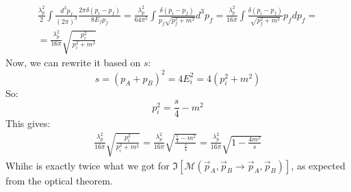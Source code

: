 \documentclass{article}
\begin{document}
\begin{equation}
\begin{gathered}
    \frac{\lambda_p^2}{2}\int \frac{d^3p_f}{(2\pi)^3} \frac{2\pi \delta(p_i - p_f)}{8E_fp_f} =
    \frac{\lambda_p^2}{64\pi^2}\int \frac{\delta(p_i - p_f)}{p_f\sqrt{p_f^2 + m^2}}d^3p_f = 
    \frac{\lambda_p^2}{16\pi}\int \frac{\delta(p_i - p_f)}{\sqrt{p_f^2 + m^2}}p_f dp_f = \\ =
    \frac{\lambda_p^2}{16\pi}\sqrt{\frac{p_i^2}{p_i^2 + m^2}}
\end{gathered}
\end{equation}
Now, we can rewrite it based on $s$:
\begin{equation}
    s = (p_A + p_B)^2 = 4E_i^2 = 4\left(p_i^2 + m^2\right)
\end{equation}
So:
\begin{equation}
    p_i^2 = \frac{s}{4} - m^2
\end{equation}
This gives:
\begin{equation}
\begin{gathered}
    \frac{\lambda_p^2}{16\pi}\sqrt{\frac{p_i^2}{p_i^2 + m^2}} =
    \frac{\lambda_p^2}{16\pi}\sqrt{\frac{\frac{s}{4} - m^2}{\frac{s}{4}}} =
    \frac{\lambda_p^2}{16\pi}\sqrt{1 - \frac{4m^2}{s}}
\end{gathered}
\end{equation}
Whihc is exactly twice what we got for $\Im[\mathcal{M}(\vec{p}_A, \vec{p}_B \rightarrow \vec{p}_A, \vec{p}_B)]$, as expected from the optical theorem.
\end{document}
